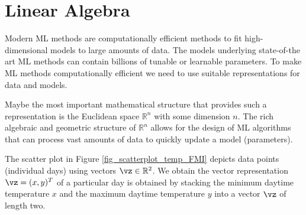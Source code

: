 \documentclass[12pt]{report}
\begin{document}
%
%
%
%
%
%


\section{Linear Algebra} 

Modern ML methods are computationally efficient methods to fit high-dimensional 
models to large amounts of data. The models underlying state-of-the art 
ML methods can contain billions of tunable or learnable parameters. To 
make ML methods computationally efficient we need to use suitable representations 
for data and models. 

Maybe the most important mathematical structure that provides such a 
representation is the Euclidean space $\mathbb{R}^{n}$ with some dimension 
$n$. The rich algebraic and geometric structure of $\mathbb{R}^{n}$ allows 
for the design of ML algorithms that can process vast amounts of data to 
quickly update a model (parameters). 

The scatter plot in Figure \ref{fig_scatterplot_temp_FMI} depicts 
data points (individual days) using vectors $\vz \in \mathbb{R}^{2}$. 
We obtain the vector representation $\vz=(x,y)^{T}$ of a particular 
day is obtained by stacking the minimum daytime temperature $x$ 
and the maximum daytime temperature $y$ into a vector $\vz$ of 
length two. 
\end{document}
